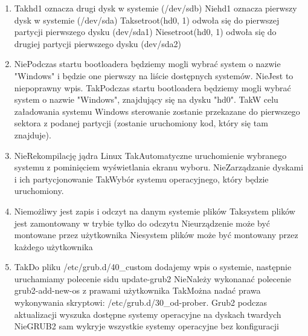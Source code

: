 \begin{enumerate}
	\item {}
	{Tak}{hd1 oznacza drugi dysk w systemie (/dev/sdb)}
	{Nie}{hd1 oznacza pierwszy dysk w systemie (/dev/sda)}
	{Tak}{setroot(hd0, 1) odwoła się do pierwszej partycji pierwszego dysku (dev/sda1)}
	{Nie}{setroot(hd0, 1) odwoła się do drugiej partycji pierwszego dysku (dev/sda2)}
	
	\item {}
	{Nie}{Podczas startu bootloadera będziemy mogli wybrać system o nazwie "Windows" i będzie one pierwszy na liście dostępnych systemów.}
	{Nie}{Jest to niepoprawny wpis.}
	{Tak}{Podczas startu bootloadera będziemy mogli wybrać system o nazwie "Windows", znajdujący się na dysku "hd0".}
	{Tak}{W celu załadowania systemu Windows sterowanie zostanie przekazane do pierwszego sektora z podanej partycji (zostanie uruchomiony kod, który się tam znajduje).}

	\item {}
	{Nie}{Rekompilację jądra Linux}
	{Tak}{Automatyczne uruchomienie wybranego systemu z pominięciem wyświetlania ekranu wyboru.}
	{Nie}{Zarządzanie dyskami i ich partycjonowanie}
	{Tak}{Wybór systemu operacyjnego, który będzie uruchomiony.}

	\item {}
	{Nie}{możliwy jest zapis i odczyt na danym systemie plików}
	{Tak}{system plików jest zamontowany w trybie tylko do odczytu}
	{Nie}{urządzenie może być montowane przez użytkownika}
	{Nie}{system plików może być montowany przez każdego użytkownika}
	
	\item {}
	{Tak}{Do pliku /etc/grub.d/40\_custom dodajemy wpis o systemie, następnie uruchamiamy polecenie sidu update-grub2}
	{Nie}{Należy wykonanać polecenie grub2-add-new-os z prawami użytkownika}
	{Tak}{Można nadać prawa wykonywania skryptowi: /etc/grub.d/30\_od-prober. Grub2 podczas aktualizacji wyszuka dostępne systemy operacyjne na dyskach twardych}
	{Nie}{GRUB2 sam wykryje wszystkie systemy operacyjne bez konfiguracji}
	

\end{enumerate}
